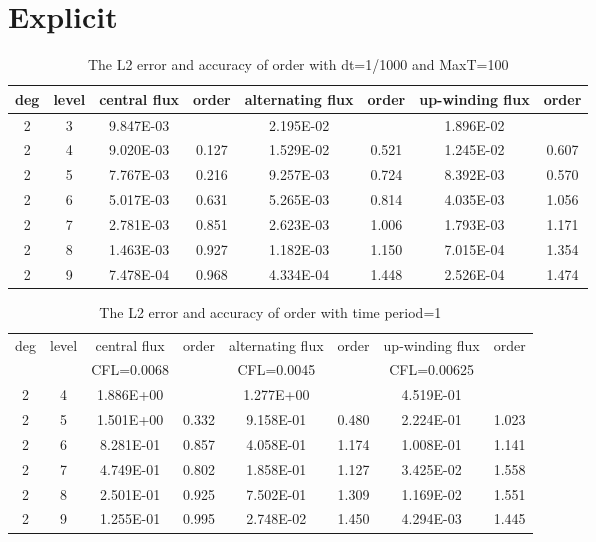 \documentclass[a4paper]{article}
\begin{document}
\section{Explicit}
\begin{table}[htbp]
\caption{\label{tab:test}The L2 error and accuracy of order with dt=1/1000 and MaxT=100}
\centering
\vspace{5pt}
\begin{tabular}{cccccccc}
\toprule
deg &level &central flux &order &alternating flux &order &up-winding flux &order\\
\midrule
2 &3 &9.847E-03 &         &2.195E-02 &         &1.896E-02 &         \\
2 &4 &9.020E-03 &0.127&1.529E-02 &0.521&1.245E-02 &0.607\\
2 &5 &7.767E-03 &0.216&9.257E-03 &0.724&8.392E-03 &0.570\\
2 &6 &5.017E-03 &0.631&5.265E-03 &0.814&4.035E-03 &1.056\\
2 &7 &2.781E-03 &0.851&2.623E-03 &1.006&1.793E-03 &1.171\\
2 &8 &1.463E-03 &0.927&1.182E-03 &1.150&7.015E-04 &1.354\\
2 &9 &7.478E-04 &0.968&4.334E-04 &1.448&2.526E-04 &1.474\\
\bottomrule
\end{tabular}
\end{table}
\begin{table}[htbp]
\caption{\label{tab:test}The L2 error and accuracy of order with time period=1}
\centering
\vspace{5pt}
\begin{tabular}{cccccccc}
\toprule
deg &level &central flux &order &alternating flux &order &up-winding flux &order\\
       &        &CFL=0.0068 &         &CFL=0.0045       &         &CFL=0.00625         &         \\
\midrule
2 &4 &1.886E+00 &         &1.277E+00 &        &4.519E-01 &        \\
2 &5 &1.501E+00 &0.332&9.158E-01 &0.480&2.224E-01 &1.023\\
2 &6 &8.281E-01 &0.857&4.058E-01 &1.174&1.008E-01 &1.141\\
2 &7 &4.749E-01 &0.802&1.858E-01 &1.127&3.425E-02 &1.558\\
2 &8 &2.501E-01 &0.925&7.502E-01 &1.309&1.169E-02 &1.551\\
2 &9 &1.255E-01 &0.995&2.748E-02 &1.450&4.294E-03 &1.445\\    

\bottomrule
\end{tabular}

\end{table}
\end{document}

